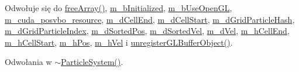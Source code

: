 Odwołuje się do \hyperlink{particle_system__cuda_8cu_source_l00073}{free\-Array()}, \hyperlink{particle_system_8h_source_l00193}{m\-\_\-b\-Initialized}, \hyperlink{particle_system_8h_source_l00193}{m\-\_\-b\-Use\-Open\-G\-L}, \hyperlink{particle_system_8h_source_l00225}{m\-\_\-cuda\-\_\-posvbo\-\_\-resource}, \hyperlink{particle_system_8h_source_l00215}{m\-\_\-d\-Cell\-End}, \hyperlink{particle_system_8h_source_l00214}{m\-\_\-d\-Cell\-Start}, \hyperlink{particle_system_8h_source_l00212}{m\-\_\-d\-Grid\-Particle\-Hash}, \hyperlink{particle_system_8h_source_l00213}{m\-\_\-d\-Grid\-Particle\-Index}, \hyperlink{particle_system_8h_source_l00208}{m\-\_\-d\-Sorted\-Pos}, \hyperlink{particle_system_8h_source_l00209}{m\-\_\-d\-Sorted\-Vel}, \hyperlink{particle_system_8h_source_l00206}{m\-\_\-d\-Vel}, \hyperlink{particle_system_8h_source_l00202}{m\-\_\-h\-Cell\-End}, \hyperlink{particle_system_8h_source_l00201}{m\-\_\-h\-Cell\-Start}, \hyperlink{particle_system_8h_source_l00197}{m\-\_\-h\-Pos}, \hyperlink{particle_system_8h_source_l00198}{m\-\_\-h\-Vel} i \hyperlink{particle_system__cuda_8cu_source_l00094}{unregister\-G\-L\-Buffer\-Object()}.



Odwołania w \hyperlink{particle_system_8cpp_source_l00097}{$\sim$\-Particle\-System()}.


